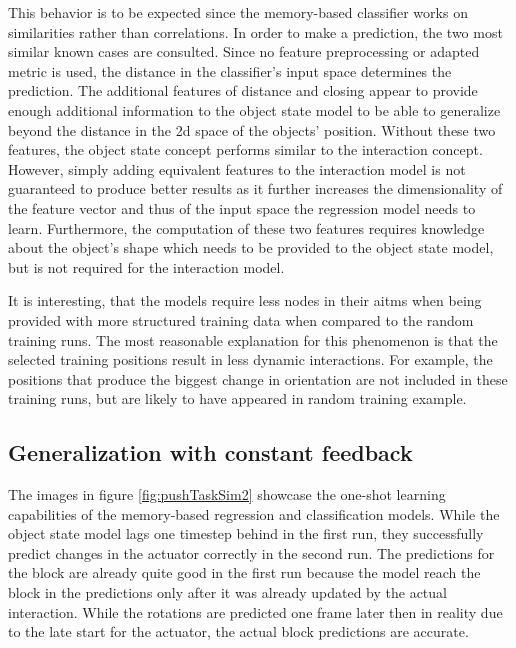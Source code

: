 This behavior is to be expected since the memory-based classifier works on similarities rather than correlations. In order to make a prediction, the two most similar known cases are consulted. Since no feature preprocessing or adapted metric is used, the distance in the classifier's input space determines the prediction. The additional features of distance and closing appear to provide enough additional information to the object state model to be able to generalize beyond the distance in the 2d space of the objects' position. Without these two features, the object state concept performs similar to the interaction concept.
However, simply adding equivalent features to the interaction model is not guaranteed to produce better results as it further increases the dimensionality of the feature vector and thus of the input space the regression model needs to learn. Furthermore, the computation of these two features requires knowledge about the object's shape which needs to be provided to the object state model, but is not required for the interaction model.

It is interesting, that the models require less nodes in their \glspl{aitm} when being provided with more structured training data when compared to the random training runs.
The most reasonable explanation for this phenomenon is that the selected training positions result in less dynamic interactions. For example, the positions that produce the biggest change in orientation are not included in these training runs, but are likely to have appeared in random training example.  


\subsection{Generalization with constant feedback} 
The images in figure \ref{fig:pushTaskSim2} showcase the one-shot learning capabilities of the memory-based regression and classification models. While the object state model lags one timestep behind in the first run, they successfully predict changes in the actuator correctly in the second run. 
The predictions for the block are already quite good in the first run because the model reach the block in the predictions only after it was already updated by the actual interaction. While the rotations are predicted one frame later then in reality due to the late start for the actuator, the actual block predictions are accurate.

